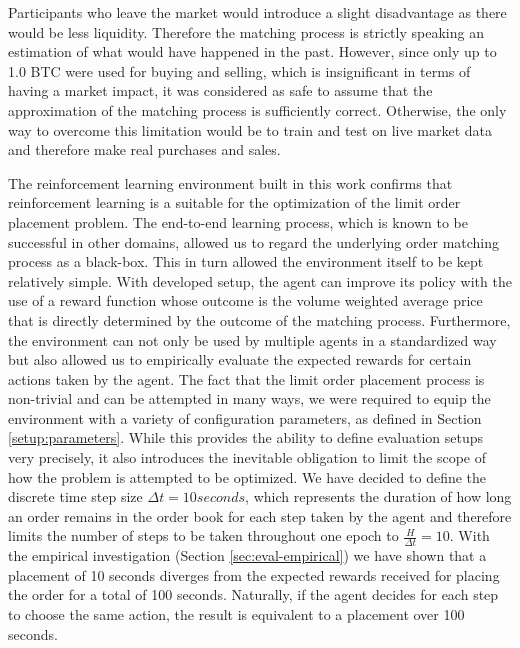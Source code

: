     Participants who leave the market would introduce a slight disadvantage as there would be less liquidity.
    Therefore the matching process is strictly speaking an estimation of what would have happened in the past.
    However, since only up to 1.0 BTC were used for buying and selling, which is insignificant in terms of having a market impact\cite{hautsch2012market}, it was considered as safe to assume that the approximation of the matching process is sufficiently correct.
    Otherwise, the only way to overcome this limitation would be to train and test on live market data and therefore make real purchases and sales.
    
    The reinforcement learning environment built in this work confirms that reinforcement learning is a suitable for the optimization of the limit order placement problem.
    The end-to-end learning process, which is known to be successful in other domains\cite{amodei2016deep, mnih2015human, mnih2013playing}, allowed us to regard the underlying order matching process as a black-box.
    This in turn allowed the environment itself to be kept relatively simple.
    With developed setup, the agent can improve its policy with the use of a reward function whose outcome is the volume weighted average price that is directly determined by the outcome of the matching process.
    Furthermore, the environment can not only be used by multiple agents in a standardized way but also allowed us to empirically evaluate the expected rewards for certain actions taken by the agent.
    The fact that the limit order placement process is non-trivial and can be attempted in many ways, we were required to equip the environment with a variety of configuration parameters, as defined in Section \ref{setup:parameters}.
    While this provides the ability to define evaluation setups very precisely, it also introduces the inevitable obligation to limit the scope of how the problem is attempted to be optimized.
    We have decided to define the discrete time step size $\Delta{t}=10 seconds$, which represents the duration of how long an order remains in the order book for each step taken by the agent and therefore limits the number of steps to be taken throughout one epoch to $\frac{H}{\Delta{t}}=10$.
    With the empirical investigation (Section \ref{sec:eval-empirical}) we have shown that a placement of 10 seconds diverges from the expected rewards received for placing the order for a total of 100 seconds.
    Naturally, if the agent decides for each step to choose the same action, the result is equivalent to a placement over 100 seconds.
